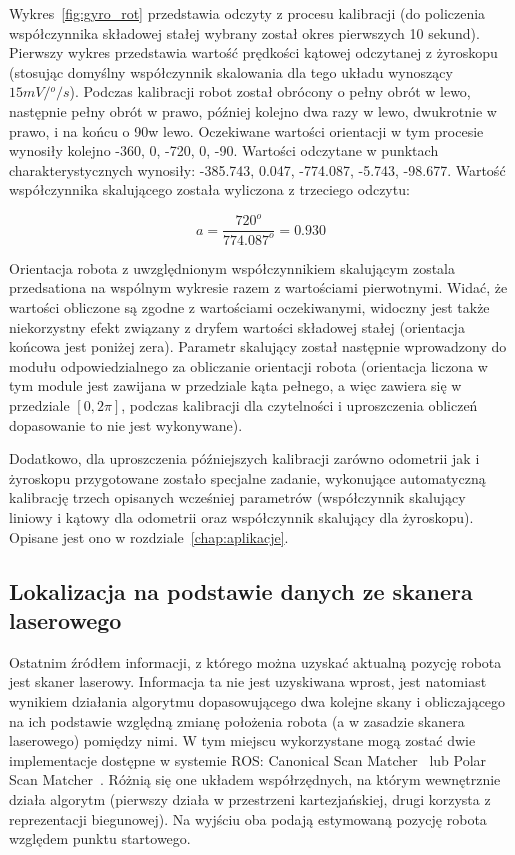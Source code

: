 Wykres~\ref{fig:gyro_rot} przedstawia odczyty z procesu kalibracji (do
policzenia współczynnika składowej stałej wybrany został okres pierwszych 10
sekund). Pierwszy wykres przedstawia wartość prędkości kątowej odczytanej z
żyroskopu (stosując domyślny współczynnik skalowania dla tego układu wynoszący
$15mV/{}^o/s$). Podczas kalibracji robot został obrócony o pełny obrót w
lewo, następnie pełny obrót w prawo, później kolejno dwa razy w lewo, dwukrotnie
w prawo, i na końcu o 90\textdegree w lewo. Oczekiwane wartości orientacji w tym
procesie wynosiły kolejno -360\textdegree, 0\textdegree, -720\textdegree,
0\textdegree, -90\textdegree. Wartości odczytane w punktach charakterystycznych
wynosiły: -385.743\textdegree, 0.047\textdegree, -774.087\textdegree,
-5.743\textdegree, -98.677\textdegree. Wartość współczynnika skalującego została
wyliczona z trzeciego odczytu:

\[
a = \frac{720^o}{774.087^o} = 0.930
\]

Orientacja robota z uwzględnionym współczynnikiem skalującym zostala
przedsationa na wspólnym wykresie razem z wartościami pierwotnymi. Widać, że
wartości obliczone są zgodne z wartościami oczekiwanymi, widoczny jest także
niekorzystny efekt związany z dryfem wartości składowej stałej (orientacja
końcowa jest poniżej zera). Parametr skalujący został następnie wprowadzony
do modułu odpowiedzialnego za obliczanie orientacji robota (orientacja liczona
w tym module jest zawijana w przedziale kąta pełnego, a więc zawiera się w
przedziale $[0, 2\pi]$, podczas kalibracji dla czytelności i uproszczenia
obliczeń dopasowanie to nie jest wykonywane).

Dodatkowo, dla uproszczenia późniejszych kalibracji zarówno odometrii jak i
żyroskopu przygotowane zostało specjalne zadanie, wykonujące automatyczną
kalibrację trzech opisanych wcześniej parametrów (współczynnik skalujący
liniowy i kątowy dla odometrii oraz współczynnik skalujący dla żyroskopu).
Opisane jest ono w rozdziale~\ref{chap:aplikacje}.

\subsection{Lokalizacja na podstawie danych ze skanera laserowego}

Ostatnim źródłem informacji, z którego można uzyskać aktualną pozycję robota
jest skaner laserowy. Informacja ta nie jest uzyskiwana wprost, jest natomiast
wynikiem działania algorytmu dopasowującego dwa kolejne skany i obliczającego
na ich podstawie względną zmianę położenia robota (a w zasadzie skanera laserowego)
pomiędzy nimi. W tym miejscu wykorzystane mogą zostać dwie implementacje
dostępne w systemie ROS: Canonical Scan Matcher~\cite{4543181} lub Polar Scan
Matcher~\cite{laser_slam}. Różnią się one układem współrzędnych, na którym
wewnętrznie działa algorytm (pierwszy działa w przestrzeni kartezjańskiej,
drugi korzysta z reprezentacji biegunowej). Na wyjściu oba podają estymowaną
pozycję robota względem punktu startowego.

